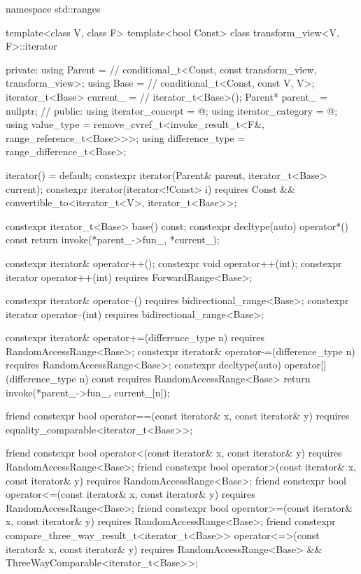 \begin{codeblock}
namespace std::ranges {
  template<class V, class F>
  template<bool Const>
  class transform_view<V, F>::iterator {
  private:
    using Parent =                              // \expos
      conditional_t<Const, const transform_view, transform_view>;
    using Base   =                              // \expos
      conditional_t<Const, const V, V>;
    iterator_t<Base> current_ =                 // \expos
      iterator_t<Base>();
    Parent* parent_ = nullptr;                  // \expos
  public:
    using iterator_concept  = @\seebelow@;
    using iterator_category = @\seebelow@;
    using value_type        =
      remove_cvref_t<invoke_result_t<F&, range_reference_t<Base>>>;
    using difference_type   = range_difference_t<Base>;

    iterator() = default;
    constexpr iterator(Parent& parent, iterator_t<Base> current);
    constexpr iterator(iterator<!Const> i)
      requires Const && convertible_to<iterator_t<V>, iterator_t<Base>>;

    constexpr iterator_t<Base> base() const;
    constexpr decltype(auto) operator*() const
    { return invoke(*parent_->fun_, *current_); }

    constexpr iterator& operator++();
    constexpr void operator++(int);
    constexpr iterator operator++(int) requires ForwardRange<Base>;

    constexpr iterator& operator--() requires bidirectional_range<Base>;
    constexpr iterator operator--(int) requires bidirectional_range<Base>;

    constexpr iterator& operator+=(difference_type n)
      requires RandomAccessRange<Base>;
    constexpr iterator& operator-=(difference_type n)
      requires RandomAccessRange<Base>;
    constexpr decltype(auto) operator[](difference_type n) const
      requires RandomAccessRange<Base>
    { return invoke(*parent_->fun_, current_[n]); }

    friend constexpr bool operator==(const iterator& x, const iterator& y)
      requires equality_comparable<iterator_t<Base>>;

    friend constexpr bool operator<(const iterator& x, const iterator& y)
      requires RandomAccessRange<Base>;
    friend constexpr bool operator>(const iterator& x, const iterator& y)
      requires RandomAccessRange<Base>;
    friend constexpr bool operator<=(const iterator& x, const iterator& y)
      requires RandomAccessRange<Base>;
    friend constexpr bool operator>=(const iterator& x, const iterator& y)
      requires RandomAccessRange<Base>;
    friend constexpr compare_three_way_result_t<iterator_t<Base>>
      operator<=>(const iterator& x, const iterator& y)
        requires RandomAccessRange<Base> && ThreeWayComparable<iterator_t<Base>>;

}}
\end{codeblock}
